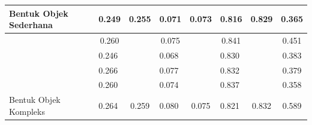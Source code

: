 \begin{table}[]
\begin{tabular}{|l|cc|cc|cc|c|}
  \multirow{-5}{*}{Bentuk Objek Sederhana}            & \multicolumn{1}{c|}{\cellcolor[HTML]{FFFFFF}0.249} & \multirow{-5}{*}{\cellcolor[HTML]{FFFFFF}0.255}  & \multicolumn{1}{c|}{\cellcolor[HTML]{FFFFFF}0.071} & \multirow{-5}{*}{\cellcolor[HTML]{FFFFFF}0.073}    & \multicolumn{1}{c|}{\cellcolor[HTML]{FFFFFF}0.816} & \multirow{-5}{*}{\cellcolor[HTML]{FFFFFF}0.829} & \multicolumn{1}{c|}{\cellcolor[HTML]{FFFFFF}0.365}   \\ \hline
                                                      & \multicolumn{1}{c|}{0.260}                         & \cellcolor[HTML]{FFFFFF}                         & \multicolumn{1}{c|}{0.075}                         & \cellcolor[HTML]{FFFFFF}                           & \multicolumn{1}{c|}{0.841}                         & \cellcolor[HTML]{FFFFFF}                        & \multicolumn{1}{c|}{\cellcolor[HTML]{FFFFFF}0.451}   \\ \cline{2-2} \cline{4-4} \cline{6-6}
                                                      & \multicolumn{1}{l|}{0.246}                         & \cellcolor[HTML]{FFFFFF}                         & \multicolumn{1}{l|}{0.068}                         & \cellcolor[HTML]{FFFFFF}                           & \multicolumn{1}{l|}{0.830}                         & \cellcolor[HTML]{FFFFFF}                        & \multicolumn{1}{c|}{\cellcolor[HTML]{FFFFFF}0.383}   \\ \cline{2-2} \cline{4-4} \cline{6-6}
                                                      & \multicolumn{1}{l|}{0.266}                         & \cellcolor[HTML]{FFFFFF}                         & \multicolumn{1}{l|}{0.077}                         & \cellcolor[HTML]{FFFFFF}                           & \multicolumn{1}{l|}{0.832}                         & \cellcolor[HTML]{FFFFFF}                        & \multicolumn{1}{c|}{\cellcolor[HTML]{FFFFFF}0.379}   \\ \cline{2-2} \cline{4-4} \cline{6-6}
                                                      & \multicolumn{1}{l|}{0.260}                         & \cellcolor[HTML]{FFFFFF}                         & \multicolumn{1}{l|}{0.074}                         & \cellcolor[HTML]{FFFFFF}                           & \multicolumn{1}{l|}{0.837}                         & \cellcolor[HTML]{FFFFFF}                        & \multicolumn{1}{c|}{\cellcolor[HTML]{FFFFFF}0.358}   \\ \cline{2-2} \cline{4-4} \cline{6-6}
  \multirow{-5}{*}{Bentuk Objek Kompleks}             & \multicolumn{1}{l|}{0.264}                         & \multirow{-5}{*}{\cellcolor[HTML]{FFFFFF}0.259}  & \multicolumn{1}{l|}{0.080}                         & \multirow{-5}{*}{\cellcolor[HTML]{FFFFFF}0.075}    & \multicolumn{1}{l|}{0.821}                         & \multirow{-5}{*}{\cellcolor[HTML]{FFFFFF}0.832} & \multicolumn{1}{c|}{\cellcolor[HTML]{FFFFFF}0.589}   \\ \hline

\end{tabular}
\end{table}
